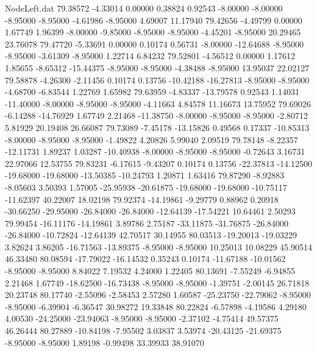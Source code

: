 \begin{filecontents}{NodeLeft.dat}
  79.38572   -4.33014    0.00000     0.38824    0.92543   -8.00000   -8.00000   -8.95000   -8.95000   -4.61986   -8.95000    4.69007   11.17940
  79.42656   -4.49799    0.00000     1.67749    1.96399   -8.00000   -9.85000   -8.95000   -8.95000   -4.45201   -8.95000   20.29465   23.76078
  79.47720   -5.33691    0.00000     0.10174    0.56731   -8.00000  -12.64688   -8.95000   -8.95000   -3.61309   -8.95000    1.22714    6.84232
  79.52801   -4.56512    0.00000     1.17612    1.85655   -8.65312  -15.44375   -8.95000   -8.95000   -4.38488   -8.95000   13.95037   22.02127
  79.58878   -4.26300   -2.11456     0.10174    0.13756  -10.42188  -16.27813   -8.95000   -8.95000   -4.68700   -6.83544    1.22769    1.65982
  79.63959   -4.83337  -13.79578     0.92543    1.14031  -11.40000   -8.00000   -8.95000   -8.95000   -4.11663    4.84578   11.16673   13.75952
  79.69026   -6.14288  -14.76929     1.67749    2.21468  -11.38750   -8.00000   -8.95000   -8.95000   -2.80712    5.81929   20.19408   26.66087
  79.73089   -7.45178  -13.15826     0.49568    0.17337  -10.85313   -8.00000   -8.95000   -8.95000   -1.49822    4.20826    5.99040    2.09519
  79.78148   -8.22357  -12.11731     1.89237    1.03287  -10.40938   -8.00000   -8.95000   -8.95000   -0.72643    3.16731   22.97066   12.53755
  79.83231   -6.17615   -9.43207     0.10174    0.13756  -22.37813  -14.12500  -19.68000  -19.68000  -13.50385  -10.24793    1.20871    1.63416
  79.87290   -8.92883   -8.05603     3.50393    1.57005  -25.95938  -20.61875  -19.68000  -19.68000  -10.75117  -11.62397   40.22007   18.02198
  79.92374  -14.19861   -9.29779     0.88962    0.20918  -30.66250  -29.95000  -26.84000  -26.84000  -12.64139  -17.54221   10.64461    2.50293
  79.99454  -16.11176  -14.19861     3.89786    2.75187  -33.11875  -31.76875  -26.84000  -26.84000  -10.72824  -12.64139   42.70517   30.14955
  80.03513  -19.20013  -19.03229     3.82624    3.86205  -16.71563  -13.89375   -8.95000   -8.95000   10.25013   10.08229   45.90514   46.33480
  80.08594  -17.79022  -16.14532     0.35243    0.10174  -11.67188  -10.01562   -8.95000   -8.95000    8.84022    7.19532    4.24000    1.22405
  80.13691   -7.55249   -6.94855     2.21468    1.67749  -18.62500  -16.73438   -8.95000   -8.95000   -1.39751   -2.00145   26.71818   20.23748
  80.17740   -2.55096   -2.58453     2.57280    1.60587  -25.23750  -22.79062   -8.95000   -8.95000   -6.39904   -6.36547   30.98272   19.33848
  80.22824   -6.57898   -4.19586     4.29180    4.00530  -24.25000  -23.94063   -8.95000   -8.95000   -2.37102   -4.75414   49.57375   46.26444
  80.27889  -10.84198   -7.95502     3.03837    3.53974  -20.43125  -21.69375   -8.95000   -8.95000    1.89198   -0.99498   33.39933   38.91070

\end{filecontents}

